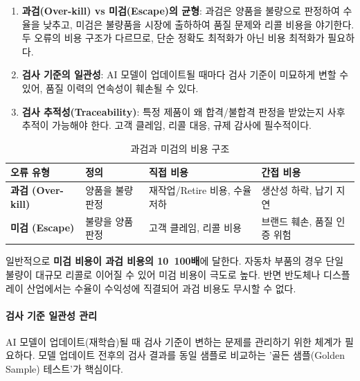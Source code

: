 \begin{enumerate}
 \item \textbf{과검(Over-kill) vs 미검(Escape)의 균형}: 과검은 양품을 불량으로 판정하여 수율을 낮추고, 미검은 불량품을 시장에 출하하여 품질 문제와 리콜 비용을 야기한다. 두 오류의 비용 구조가 다르므로, 단순 정확도 최적화가 아닌 비용 최적화가 필요하다.
 \item \textbf{검사 기준의 일관성}: AI 모델이 업데이트될 때마다 검사 기준이 미묘하게 변할 수 있어, 품질 이력의 연속성이 훼손될 수 있다.
 \item \textbf{검사 추적성(Traceability)}: 특정 제품이 왜 합격/불합격 판정을 받았는지 사후 추적이 가능해야 한다. 고객 클레임, 리콜 대응, 규제 감사에 필수적이다.
\end{enumerate}

\begin{table}[htbp]
\centering
\caption{과검과 미검의 비용 구조}
\label{tab:19_8}
\begin{tabularx}{\textwidth}{p{3cm}p{3cm}XX}
\toprule
\textbf{오류 유형} & \textbf{정의} & \textbf{직접 비용} & \textbf{간접 비용} \\
\midrule
\textbf{과검 (Over-kill)} & 양품을 불량 판정 & 재작업/Retire 비용, 수율 저하 & 생산성 하락, 납기 지연 \\
\textbf{미검 (Escape)} & 불량을 양품 판정 & 고객 클레임, 리콜 비용 & 브랜드 훼손, 품질 인증 위험 \\
\bottomrule
\end{tabularx}
\end{table}

일반적으로 \textbf{미검 비용이 과검 비용의 10~100배}에 달한다. 자동차 부품의 경우 단일 불량이 대규모 리콜로 이어질 수 있어 미검 비용이 극도로 높다. 반면 반도체나 디스플레이 산업에서는 수율이 수익성에 직결되어 과검 비용도 무시할 수 없다.

\paragraph{검사 기준 일관성 관리}

AI 모델이 업데이트(재학습)될 때 검사 기준이 변하는 문제를 관리하기 위한 체계가 필요하다. 모델 업데이트 전후의 검사 결과를 동일 샘플로 비교하는 '골든 샘플(Golden Sample) 테스트'가 핵심이다.

